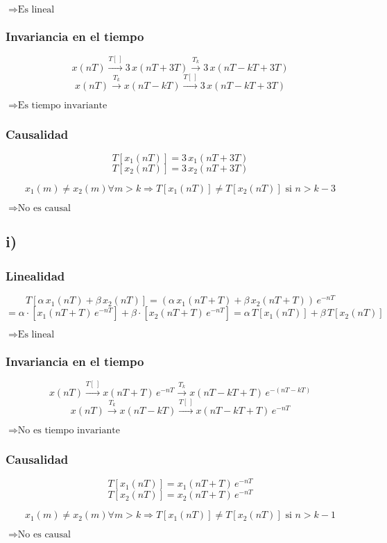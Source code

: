\documentclass[../../guia1.tex]{subfiles}
\begin{document}
\begin{center}
 $\Rightarrow \text{Es lineal}$
\end{center}
\subsubsection*{Invariancia en el tiempo}
\[x(nT) \xrightarrow{T[\,]} 3\,x(nT+3T)\xrightarrow{T_k} 3\,x(nT-kT+3T)\]
\[x(nT) \xrightarrow{T_k} x(nT-kT) \xrightarrow{T[\,]} 3\,x(nT-kT+3T)\]
\begin{center}
 $\Rightarrow \text{Es tiempo invariante}$
\end{center}
\subsubsection*{Causalidad}
\[T[x_1(nT)] = 3\,x_1(nT+3T)\]
\[T[x_2(nT)] = 3\,x_2(nT+3T)\]

\[x_1(m)\neq x_2(m) \forall m>k \Rightarrow T[x_1(nT)]\neq T[x_2(nT)] \text{ si } n > k-3 \]
\begin{center}
 $\Rightarrow \text{No es causal}$
\end{center}

\subsection*{i)}
\subsubsection*{Linealidad}
\[T[\alpha\, x_1(nT) + \beta\, x_2(nT)] = (\alpha\, x_1(nT+T) + \beta\, x_2(nT+T))\,e^{-nT}\]
\[= \alpha \cdot [x_1(nT+T)\,e^{-nT}] + \beta \cdot [x_2(nT+T)\,e^{-nT}] = \alpha\, T[x_1(nT)] + \beta \, T[x_2(nT)]\]
\begin{center}
 $\Rightarrow \text{Es lineal}$
\end{center}

\subsubsection*{Invariancia en el tiempo}
\[x(nT) \xrightarrow{T[\,]} x(nT+T)\,e^{-nT}\xrightarrow{T_k} x(nT-kT+T)\,e^{-(nT-kT)} \]
\[x(nT) \xrightarrow{T_k} x(nT-kT) \xrightarrow{T[\,]} x(nT-kT+T)\,e^{-nT}\]
\begin{center}
 $\Rightarrow \text{No es tiempo invariante}$
\end{center}

\subsubsection*{Causalidad}
\[T[x_1(nT)] = x_1(nT+T)\,e^{-nT}\]
\[T[x_2(nT)] = x_2(nT+T)\,e^{-nT}\]

\[x_1(m)\neq x_2(m) \forall m>k \Rightarrow T[x_1(nT)]\neq T[x_2(nT)] \text{ si } n > k-1 \]
\begin{center}
 $\Rightarrow \text{No es causal}$
\end{center}
\end{document}
